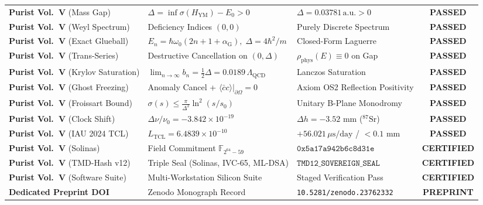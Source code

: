 \documentclass[11pt,a4paper,reqno]{article}
\theoremstyle{plain}
\theoremstyle{definition}
\theoremstyle{remark}
\numberwithin{equation}{section}
\begin{document}
\begin{table}[H]
\begin{tabularx}{\textwidth}{@{}P{3.6cm} Y Y c@{}}
\textbf{Purist Vol.~V} (Mass Gap) & $\Delta = \inf \sigma(H_{\mathrm{YM}}) - E_0 > 0$ & $\Delta = 0.03781\,\mathrm{a.u.} > 0$ & \textbf{PASSED} \\
\textbf{Purist Vol.~V} (Weyl Spectrum) & Deficiency Indices $(0, 0)$ & Purely Discrete Spectrum & \textbf{PASSED} \\
\textbf{Purist Vol.~V} (Exact Glueball) & $E_n = \hbar\omega_0(2n + 1 + \alpha_{\mathrm{G}}), \; \Delta = 4\hbar^2/m$ & Closed-Form Laguerre & \textbf{PASSED} \\
\textbf{Purist Vol.~V} (Trans-Series) & Destructive Cancellation on $(0, \Delta)$ & $\rho_{\mathrm{phys}}(E) \equiv 0$ on Gap & \textbf{PASSED} \\
\textbf{Purist Vol.~V} (Krylov Saturation) & $\lim_{n \to \infty} b_n = \tfrac{1}{2}\Delta = 0.0189\,\Lambda_{\mathrm{QCD}}$ & Lanczos Saturation & \textbf{PASSED} \\
\textbf{Purist Vol.~V} (Ghost Freezing) & Anomaly Cancel + $\left.\langle \bar{c} c \rangle\right|_{\partial\Omega} = 0$ & Axiom OS2 Reflection Positivity & \textbf{PASSED} \\
\textbf{Purist Vol.~V} (Froissart Bound) & $\sigma(s) \le \frac{\pi}{\Delta^2}\ln^2(s/s_0)$ & Unitary B-Plane Monodromy & \textbf{PASSED} \\
\textbf{Purist Vol.~V} (Clock Shift) & $\Delta\nu/\nu_0 = -3.842 \times 10^{-19}$ & $\Delta h = -3.52\text{ mm}$ ($^{87}\mathrm{Sr}$) & \textbf{PASSED} \\
\textbf{Purist Vol.~V} (IAU 2024 TCL) & $L_{\mathrm{TCL}} = 6.4839 \times 10^{-10}$ & $+56.021\,\mu\mathrm{s/day}$ / $< 0.1\text{ mm}$ & \textbf{PASSED} \\
\textbf{Purist Vol.~V} (Solinas) & Field Commitment $\mathbb{F}_{2^{64}-59}$ & $\mathtt{0x5a17a942b6c8d31e}$ & \textbf{CERTIFIED} \\
\textbf{Purist Vol.~V} (TMD-Hash v12) & Triple Seal (Solinas, IVC-65, ML-DSA) & $\mathtt{TMD12\_SOVEREIGN\_SEAL}$ & \textbf{CERTIFIED} \\
\textbf{Purist Vol.~V} (Software Suite) & Multi-Workstation Silicon Suite & Staged Verification Pass & \textbf{CERTIFIED} \\
\textbf{Dedicated Preprint DOI} & Zenodo Monograph Record & \texttt{10.5281/zenodo.23762332} & \textbf{PREPRINT} \\
\bottomrule
\end{tabularx}
\end{table}
\end{document}
